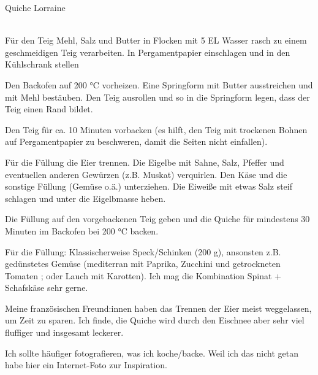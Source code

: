 \begin{recipe}
[ %
    bakingtime={\unit[30]{min}},
    bakingtemperature={\Fanoven\ \unit[200]{C}},
   portion = \portion{4},
    source = Sophie
]
{Quiche Lorraine}




\preparation
{ %
    \\
Für den Teig Mehl, Salz und Butter in Flocken mit 5 EL Wasser rasch zu einem geschmeidigen Teig verarbeiten. In Pergamentpapier einschlagen und in den Kühlschrank stellen

Den Backofen auf 200 °C vorheizen. Eine Springform mit Butter ausstreichen und mit Mehl bestäuben. Den Teig ausrollen und so in die Springform legen, dass der Teig einen Rand bildet. 

Den Teig für ca. 10 Minuten vorbacken (es hilft, den Teig mit trockenen Bohnen auf Pergamentpapier zu beschweren, damit die Seiten nicht einfallen).

Für die Füllung die Eier trennen. Die Eigelbe mit Sahne, Salz, Pfeffer und eventuellen anderen Gewürzen (z.B. Muskat) verquirlen. Den Käse und die sonstige Füllung (Gemüse o.ä.) unterziehen. Die Eiweiße mit etwas Salz steif schlagen und unter die Eigelbmasse heben. 

Die Füllung auf den vorgebackenen Teig geben und die Quiche für mindestens 30 Minuten im Backofen bei 200 °C backen.
}

\hint
    {%
    Für die Füllung: Klassischerweise Speck/Schinken (200 g), ansonsten z.B. gedünstetes Gemüse (mediterran mit Paprika, Zucchini und getrockneten Tomaten ; oder Lauch mit Karotten). Ich mag die Kombination Spinat + Schafskäse sehr gerne.
    
    Meine französischen Freund:innen haben das Trennen der Eier meist weggelassen, um Zeit zu sparen. Ich finde, die Quiche wird durch den Eischnee aber sehr viel fluffiger und insgesamt leckerer.

    Ich sollte häufiger fotografieren, was ich koche/backe. Weil ich das nicht getan habe hier ein Internet-Foto zur Inspiration.
    }

\end{recipe}
